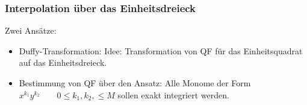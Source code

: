 \subsubsection{Interpolation über das Einheitsdreieck}
Zwei Ansätze:
\begin{itemize}
  \item Duffy-Transformation: Idee: Transformation von QF für das Einheitsquadrat auf das Einheitsdreieck.
  \item Bestimmung von QF über den Ansatz: Alle Monome der Form $x^{k_1}y^{k_2} \qquad 0 \leq k_1, k_2, \leq M$
    sollen exakt integriert werden.
\end{itemize}
